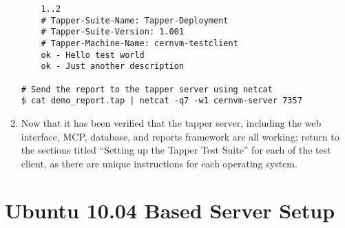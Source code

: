 \begin{enumerate}
\begin{lstlisting}
	1..2
	# Tapper-Suite-Name: Tapper-Deployment
	# Tapper-Suite-Version: 1.001
	# Tapper-Machine-Name: cernvm-testclient
	ok - Hello test world
	ok - Just another description

# Send the report to the tapper server using netcat
$ cat demo_report.tap | netcat -q7 -w1 cernvm-server 7357
\end{lstlisting}

\item	Now that it has been verified that the tapper server, including the web interface, MCP, database, and reports framework 
		are all working; return to the sections titled ``Setting up the Tapper Test Suite''	for each of the test client, as 
		there are unique instructions for each operating system.
\end{enumerate}




\section{Ubuntu 10.04 Based Server Setup}
